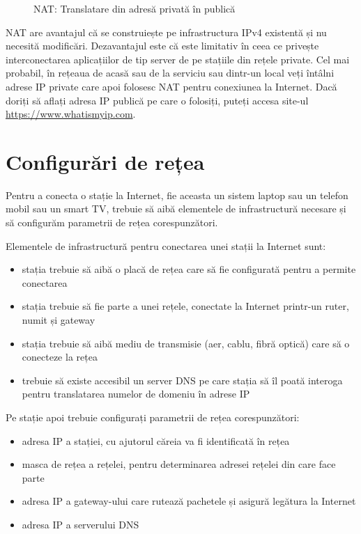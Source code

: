 \begin{figure}[htbp]
  \centering
  \def\svgwidth{\columnwidth}
  
  \caption{NAT: Translatare din adresă privată în publică}
  \label{fig:net:nat}
\end{figure}

NAT are avantajul că se construiește pe infrastructura IPv4 existentă și nu necesită modificări.
Dezavantajul este că este limitativ în ceea ce privește interconectarea aplicațiilor de tip server de pe stațiile din rețele private.
Cel mai probabil, în rețeaua de acasă sau de la serviciu sau dintr-un local veți întâlni adrese IP private care apoi folosesc NAT pentru conexiunea la Internet.
Dacă doriți să aflați adresa IP publică pe care o folosiți, puteți accesa site-ul \url{https://www.whatismyip.com}.

\section{Configurări de rețea}
\label{sec:net:config}

Pentru a conecta o stație la Internet, fie aceasta un sistem laptop sau un telefon mobil sau un smart TV, trebuie să aibă elementele de infrastructură necesare și să configurăm parametrii de rețea corespunzători.

Elementele de infrastructură pentru conectarea unei stații la Internet sunt:

\begin{itemize}
  \item stația trebuie să aibă o placă de rețea care să fie configurată pentru a permite conectarea
  \item stația trebuie să fie parte a unei rețele, conectate la Internet printr-un ruter, numit și gateway
  \item stația trebuie să aibă mediu de transmisie (aer, cablu, fibră optică) care să o conecteze la rețea
  \item trebuie să existe accesibil un server DNS pe care stația să îl poată interoga pentru translatarea numelor de domeniu în adrese IP
\end{itemize}

Pe stație apoi trebuie configurați parametrii de rețea corespunzători:

\begin{itemize}
  \item adresa IP a stației, cu ajutorul căreia va fi identificată în rețea
  \item masca de rețea a rețelei, pentru determinarea adresei rețelei din care face parte
  \item adresa IP a gateway-ului care rutează pachetele și asigură legătura la Internet
  \item adresa IP a serverului DNS
\end{itemize}

